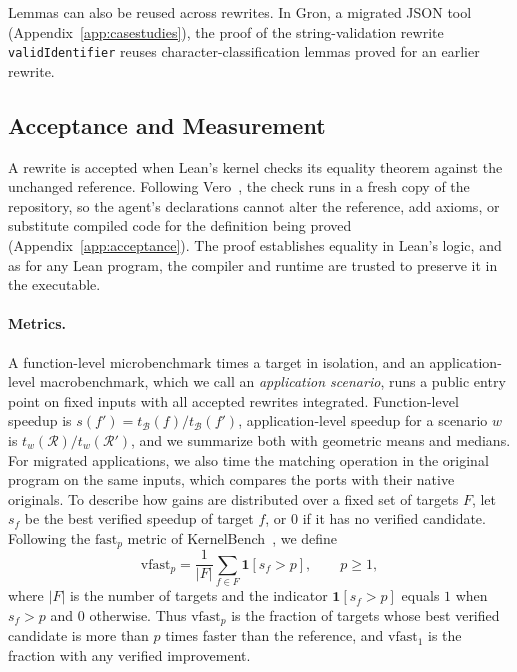 \documentclass{article}
\begin{document}
Lemmas can also be reused across rewrites.
In Gron, a migrated JSON tool (Appendix~\ref{app:casestudies}), the proof of the string-validation rewrite \texttt{validIdentifier} reuses character-classification lemmas proved for an earlier rewrite.

\subsection{Acceptance and Measurement}
\label{sec:acceptance}
\label{sec:measurement}

A rewrite is accepted when Lean's kernel checks its equality theorem against the unchanged reference.
Following Vero~\citep{ye2026vero}, the check runs in a fresh copy of the repository, so the agent's declarations cannot alter the reference, add axioms, or substitute compiled code for the definition being proved (Appendix~\ref{app:acceptance}).
The proof establishes equality in Lean's logic, and as for any Lean program, the compiler and runtime are trusted to preserve it in the executable.

\paragraph{Metrics.}
A function-level microbenchmark times a target in isolation, and an application-level macrobenchmark, which we call an \emph{application scenario}, runs a public entry point on fixed inputs with all accepted rewrites integrated.
Function-level speedup is $s(f') = t_{\mathcal{B}}(f) / t_{\mathcal{B}}(f')$, application-level speedup for a scenario $w$ is $t_w(\mathcal{R}) / t_w(\mathcal{R}')$, and we summarize both with geometric means and medians.
For migrated applications, we also time the matching operation in the original program on the same inputs, which compares the ports with their native originals.
To describe how gains are distributed over a fixed set of targets $F$, let $s_f$ be the best verified speedup of target $f$, or $0$ if it has no verified candidate.
Following the $\mathrm{fast}_p$ metric of KernelBench~\citep{ouyang2025kernelbench}, we define
\begin{equation}
\mathrm{vfast}_p = \frac{1}{|F|} \sum_{f \in F} \mathbf{1}[s_f > p],\qquad p\geq 1,
\label{eq:vfast}
\end{equation}
where $|F|$ is the number of targets and the indicator $\mathbf{1}[s_f > p]$ equals $1$ when $s_f > p$ and $0$ otherwise.
Thus $\mathrm{vfast}_p$ is the fraction of targets whose best verified candidate is more than $p$ times faster than the reference, and $\mathrm{vfast}_1$ is the fraction with any verified improvement.
\end{document}
